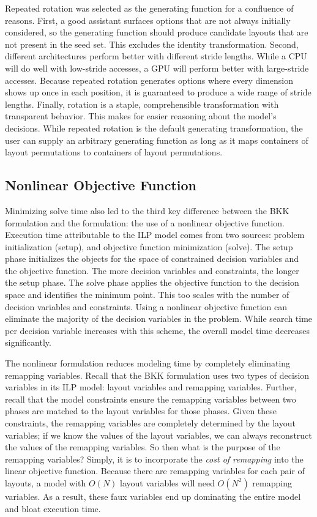 Repeated rotation was selected as the generating function for a confluence of reasons.
First, a good assistant surfaces options that are not always initially considered, so the generating function should produce candidate layouts that are not present in the seed set.
This excludes the identity transformation.
Second, different architectures perform better with different stride lengths.
While a CPU will do well with low-stride accesses, a GPU will perform better with large-stride accesses.
Because repeated rotation generates options where every dimension shows up once in each position, it is guaranteed to produce a wide range of stride lengths.
Finally, rotation is a staple, comprehensible transformation with transparent behavior.
This makes for easier reasoning about the model's decisions.
While repeated rotation is the default generating transformation, the user can supply an arbitrary generating function as long as it maps containers of layout permutations to containers of layout permutations.

\subsection{Nonlinear Objective Function}\label{sec:nonlinearFunc}

Minimizing solve time also led to the third key difference between the BKK formulation and the \FormatDecisions{} formulation: the use of a nonlinear objective function.
Execution time attributable to the ILP model comes from two sources: problem initialization (setup), and objective function minimization (solve).
The setup phase initializes the objects for the space of constrained decision variables and the objective function.
The more decision variables and constraints, the longer the setup phase.
The solve phase applies the objective function to the decision space and identifies the minimum point.
This too scales with the number of decision variables and constraints.
Using a nonlinear objective function can eliminate the majority of the decision variables in the problem.
While search time per decision variable increases with this scheme, the overall model time decreases significantly.

The nonlinear formulation reduces modeling time by completely eliminating remapping variables.
Recall that the BKK formulation uses two types of decision variables in its ILP model: layout variables and remapping variables.
Further, recall that the model constraints ensure the remapping variables between two phases are matched to the layout variables for those phases.
Given these constraints, the remapping variables are completely determined by the layout variables; 
if we know the values of the layout variables, we can always reconstruct the values of the remapping variables.
So then what is the purpose of the remapping variables? 
Simply, it is to incorporate the \textit{cost of remapping} into the linear objective function.
Because there are remapping variables for each pair of layouts, a model with $O(N)$ layout variables will need $O(N^2)$ remapping variables.
As a result, these faux variables end up dominating the entire model and bloat execution time.

